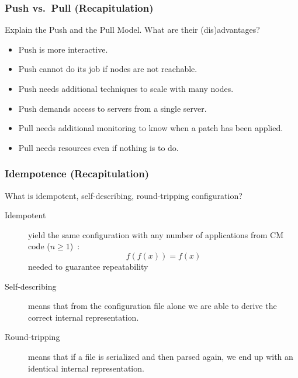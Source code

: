 \begin{frame}
	\frametitle{Push vs.\ Pull (Recapitulation)}

	\begin{task}
	Explain the Push and the Pull Model.
	What are their (dis)advantages?
	\end{task}

	\pause

	\begin{itemize} %
	\item Push is more interactive.
	\item Push cannot do its job if nodes are not reachable.
	\item Push needs additional techniques to scale with many nodes.
	\item Push demands access to servers from a single server.
	\item Pull needs additional monitoring to know when a patch has been applied.
	\item Pull needs resources even if nothing is to do.
	\end{itemize}
\end{frame}


\begin{frame}
	\frametitle{Idempotence (Recapitulation)}

	\begin{task}
	What is idempotent, self-describing, round-tripping configuration?
	\end{task}

	\pause


	\begin{description}
	\item[Idempotent]
	yield the same configuration with any number of applications from CM code ($n\ge1$)~\cite{waldemar2013testing}:
	\[
		f(f(x))=f(x)
	\]
	needed to guarantee repeatability

	\item[Self-describing]
	means that from the configuration file alone we are able to derive the correct internal representation.~\cite{wadler2003xml}

	\item[Round-tripping]
	means that if a file is serialized and then parsed again, we end up with an identical internal representation.~\cite{wadler2003xml}

	\end{description}
\end{frame}

